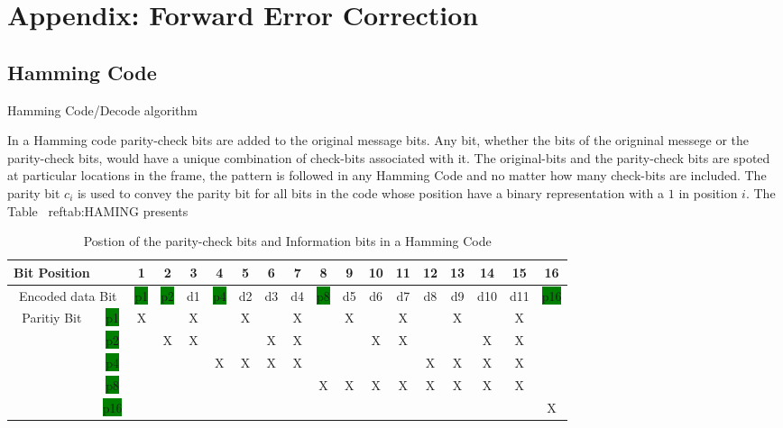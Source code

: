\chapter{Appendix: Forward Error Correction}
\label{appFEC}
\section{Hamming Code}

Hamming Code/Decode algorithm 

In a Hamming code parity-check bits are added to the original message bits. Any bit, whether the bits of the origninal messege or the parity-check bits, 
would have a unique combination of check-bits associated with it. The original-bits and the parity-check bits are spoted at particular locations in
the frame, the pattern is followed in any Hamming Code and no matter how many check-bits are included. The parity bit $c_i$ is used to convey the parity 
bit for all bits in the code whose position have a binary representation with a $1$ in position $i$. The Table ~ref{tab:HAMING} presents 

\begin{table}[!ht]
        \begin{center}
                \begin{tabular}{|c c|c|c|c|c|c|c|c|c|c|c|c|c|c|c|c|c|}
\hline
Bit Position & & 1 & 2 & 3 & 4 & 5 & 6 & 7 & 8 & 9 & 10 & 11 & 12 & 13 & 14 & 15 & 16  \\ \hline

\multicolumn{2}{|c|}{Encoded data Bit } & \colorbox{green}{p1}	& \colorbox{green}{p2} &	d1 &	\colorbox{green}{p4}	& d2 &	d3 &	d4 &	\colorbox{green}{p8} &	d5 & d6 &	d7 &	d8 &	d9 &	d10 &	d11 &	\colorbox{green}{p16}  \\ \hline

\multirow{5}{*}{Paritiy Bit} 
		 & \multicolumn{1}{|c|}{\colorbox{green}{p1}} & X &  & X &  & X &  & X &  & X &  &X &  &X&  &X &  \\ \cline{2-18}%
		 & \multicolumn{1}{|c|}{\colorbox{green}{p2}} & & X &X & & & X& X& & &X &X & & &X &X &  \\  \cline{2-18}%
		 & \multicolumn{1}{|c|}{\colorbox{green}{p4}} & & & &X &X &X &X & & & & &X &X &X &X &   \\  \cline{2-18}%
		 & \multicolumn{1}{|c|}{\colorbox{green}{p8}} & & & & & & & &X &X &X &X &X &X &X &X &   \\  \cline{2-18}%
		 & \multicolumn{1}{|c|}{\colorbox{green}{p16}} & & & & & & & & & & & & & &  & & X  \\ \hline

        	\end{tabular}
          \caption{Postion of the parity-check bits and Information bits in a Hamming Code}
	  \label{tab:HAMING}
	\end{center} 
\end{table}

